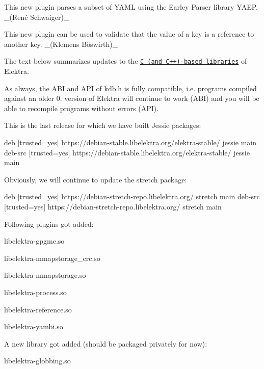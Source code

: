 This new plugin parses a subset of Y\+A\+ML using the Earley Parser library Y\+A\+EP. \+\_\+(René Schwaiger)\+\_\+

This new plugin can be used to validate that the value of a key is a reference to another key. \+\_\+(Klemens Böswirth)\+\_\+

The text below summarizes updates to the \href{https://www.libelektra.org/libraries/readme}{\tt C (and C++)-\/based libraries} of Elektra.

As always, the A\+BI and A\+PI of kdb.\+h is fully compatible, i.\+e. programs compiled against an older 0. version of Elektra will continue to work (A\+BI) and you will be able to recompile programs without errors (A\+PI).

This is the last release for which we have built Jessie packages\+:


\begin{DoxyCode}
deb     [trusted=yes] https://debian-stable.libelektra.org/elektra-stable/ jessie main
deb-src [trusted=yes] https://debian-stable.libelektra.org/elektra-stable/ jessie main
\end{DoxyCode}


Obviously, we will continue to update the stretch package\+:


\begin{DoxyCode}
deb     [trusted=yes] https://debian-stretch-repo.libelektra.org/ stretch main
deb-src [trusted=yes] https://debian-stretch-repo.libelektra.org/ stretch main
\end{DoxyCode}


Following plugins got added\+:


\begin{DoxyItemize}
\item libelektra-\/gpgme.\+so
\item libelektra-\/mmapstorage\+\_\+crc.\+so
\item libelektra-\/mmapstorage.\+so
\item libelektra-\/process.\+so
\item libelektra-\/reference.\+so
\item libelektra-\/yambi.\+so
\end{DoxyItemize}

A new library got added (should be packaged privately for now)\+:


\begin{DoxyItemize}
\item libelektra-\/globbing.\+so
\end{DoxyItemize}

